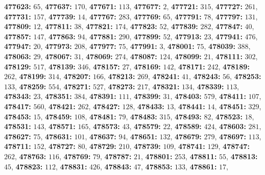 \textsf{\bfseries 477623:} $65$, \textsf{\bfseries 477637:} $170$, \textsf{\bfseries 477671:} $113$, \textsf{\bfseries 477677:} $2$, \textsf{\bfseries 477721:} $315$, \textsf{\bfseries 477727:} $261$, \textsf{\bfseries 477731:} $157$, \textsf{\bfseries 477739:} $14$, \textsf{\bfseries 477767:} $283$, \textsf{\bfseries 477769:} $65$, \textsf{\bfseries 477791:} $78$, \textsf{\bfseries 477797:} $131$, \textsf{\bfseries 477809:} $12$, \textsf{\bfseries 477811:} $38$, \textsf{\bfseries 477821:} $174$, \textsf{\bfseries 477823:} $52$, \textsf{\bfseries 477839:} $282$, \textsf{\bfseries 477847:} $40$, \textsf{\bfseries 477857:} $147$, \textsf{\bfseries 477863:} $94$, \textsf{\bfseries 477881:} $290$, \textsf{\bfseries 477899:} $52$, \textsf{\bfseries 477913:} $23$, \textsf{\bfseries 477941:} $476$, \textsf{\bfseries 477947:} $20$, \textsf{\bfseries 477973:} $208$, \textsf{\bfseries 477977:} $75$, \textsf{\bfseries 477991:} $3$, \textsf{\bfseries 478001:} $75$, \textsf{\bfseries 478039:} $388$, \textsf{\bfseries 478063:} $29$, \textsf{\bfseries 478067:} $31$, \textsf{\bfseries 478069:} $274$, \textsf{\bfseries 478087:} $124$, \textsf{\bfseries 478099:} $21$, \textsf{\bfseries 478111:} $302$, \textsf{\bfseries 478129:} $517$, \textsf{\bfseries 478139:} $346$, \textsf{\bfseries 478157:} $27$, \textsf{\bfseries 478169:} $142$, \textsf{\bfseries 478171:} $242$, \textsf{\bfseries 478189:} $262$, \textsf{\bfseries 478199:} $314$, \textsf{\bfseries 478207:} $166$, \textsf{\bfseries 478213:} $269$, \textsf{\bfseries 478241:} $41$, \textsf{\bfseries 478243:} $56$, \textsf{\bfseries 478253:} $133$, \textsf{\bfseries 478259:} $554$, \textsf{\bfseries 478271:} $527$, \textsf{\bfseries 478273:} $217$, \textsf{\bfseries 478321:} $134$, \textsf{\bfseries 478339:} $113$, \textsf{\bfseries 478343:} $23$, \textsf{\bfseries 478351:} $384$, \textsf{\bfseries 478391:} $111$, \textsf{\bfseries 478399:} $31$, \textsf{\bfseries 478403:} $579$, \textsf{\bfseries 478411:} $107$, \textsf{\bfseries 478417:} $560$, \textsf{\bfseries 478421:} $262$, \textsf{\bfseries 478427:} $128$, \textsf{\bfseries 478433:} $13$, \textsf{\bfseries 478441:} $14$, \textsf{\bfseries 478451:} $329$, \textsf{\bfseries 478453:} $15$, \textsf{\bfseries 478459:} $108$, \textsf{\bfseries 478481:} $79$, \textsf{\bfseries 478483:} $315$, \textsf{\bfseries 478493:} $82$, \textsf{\bfseries 478523:} $18$, \textsf{\bfseries 478531:} $143$, \textsf{\bfseries 478571:} $165$, \textsf{\bfseries 478573:} $43$, \textsf{\bfseries 478579:} $22$, \textsf{\bfseries 478589:} $424$, \textsf{\bfseries 478603:} $281$, \textsf{\bfseries 478627:} $75$, \textsf{\bfseries 478631:} $101$, \textsf{\bfseries 478637:} $94$, \textsf{\bfseries 478651:} $132$, \textsf{\bfseries 478679:} $279$, \textsf{\bfseries 478697:} $113$, \textsf{\bfseries 478711:} $152$, \textsf{\bfseries 478727:} $80$, \textsf{\bfseries 478729:} $210$, \textsf{\bfseries 478739:} $109$, \textsf{\bfseries 478741:} $129$, \textsf{\bfseries 478747:} $262$, \textsf{\bfseries 478763:} $116$, \textsf{\bfseries 478769:} $79$, \textsf{\bfseries 478787:} $21$, \textsf{\bfseries 478801:} $253$, \textsf{\bfseries 478811:} $55$, \textsf{\bfseries 478813:} $45$, \textsf{\bfseries 478823:} $112$, \textsf{\bfseries 478831:} $426$, \textsf{\bfseries 478843:} $47$, \textsf{\bfseries 478853:} $133$, \textsf{\bfseries 478861:} $17$, 
